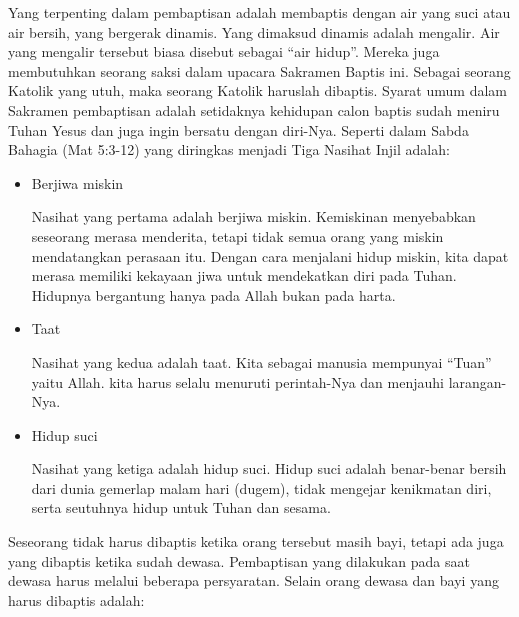 	Yang terpenting dalam pembaptisan adalah membaptis dengan air yang suci atau air bersih, yang bergerak dinamis. Yang dimaksud dinamis adalah mengalir. Air yang mengalir tersebut biasa disebut sebagai ``air hidup''. Mereka juga membutuhkan seorang saksi dalam upacara Sakramen Baptis ini. Sebagai seorang Katolik yang utuh, maka seorang Katolik haruslah dibaptis. Syarat umum dalam Sakramen pembaptisan adalah setidaknya kehidupan calon baptis sudah meniru Tuhan Yesus dan juga ingin bersatu dengan diri-Nya. Seperti dalam Sabda Bahagia (Mat 5:3-12) yang diringkas menjadi Tiga Nasihat Injil adalah:
	
	\begin{itemize}
		\item Berjiwa miskin
		
		Nasihat yang pertama adalah berjiwa miskin. Kemiskinan menyebabkan seseorang merasa menderita, tetapi tidak semua orang yang miskin mendatangkan perasaan itu. Dengan cara menjalani hidup miskin, kita dapat merasa memiliki kekayaan jiwa untuk mendekatkan diri pada Tuhan. Hidupnya bergantung hanya pada Allah bukan pada harta.
		\item Taat
		
		Nasihat yang kedua adalah taat. Kita sebagai manusia mempunyai ``Tuan'' yaitu Allah. kita harus selalu menuruti perintah-Nya dan menjauhi larangan-Nya.
		\item Hidup suci 
		
		Nasihat yang ketiga adalah hidup suci. Hidup suci adalah benar-benar bersih dari dunia gemerlap malam hari (dugem), tidak mengejar kenikmatan diri, serta seutuhnya hidup untuk Tuhan dan sesama.
	\end{itemize}
	
	Seseorang tidak harus dibaptis ketika orang tersebut masih bayi, tetapi ada juga yang dibaptis ketika sudah dewasa. Pembaptisan yang dilakukan pada saat dewasa harus melalui beberapa persyaratan. Selain orang dewasa dan bayi yang harus dibaptis adalah:
	
